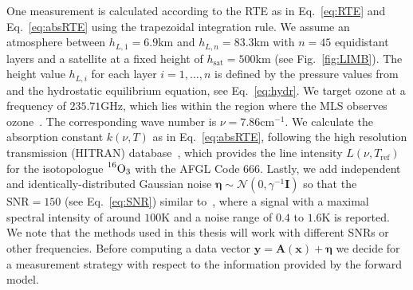 One measurement is calculated according to the RTE as in Eq.~\ref{eq:RTE} and Eq.~\ref{eq:absRTE} using the trapezoidal integration rule.
We assume an atmosphere between $h_{L,1} = 6.9$km and $h_{L,n} = 83.3$km with $n = 45$ equidistant layers and a satellite at a fixed height of $h_{\text{sat}} = 500$km (see Fig.~\ref{fig:LIMB}).
The height value $h_{L,i}$ for each layer $i = 1,\dots, n$ is defined by the pressure values from~\cite{MLSdata} and the hydrostatic equilibrium equation, see Eq.~\ref{eq:hydr}.
We target ozone at a frequency of $235.71$GHz, which lies within the region where the MLS observes ozone~\cite{livesey2008ozonecarbonmono, waters2006earth}.
The corresponding wave number is $\nu = 7.86\text{cm}^{-1}$.
We calculate the absorption constant $k(\nu,T)$ as in Eq.~\ref{eq:absRTE}, following the high resolution transmission (HITRAN) database~\cite{gordon2022hitran2020}, which provides the line intensity $L(\nu,T_{\text{ref}})$ for the isotopologue $\prescript{16}{}{\text{O}}_3$ with the AFGL Code 666.
Lastly, we add independent and identically-distributed Gaussian noise $\bm{\eta} \sim \mathcal{N}(0,\gamma^{-1} \bm{I})$ so that the $\text{SNR}=150$ (see Eq.~\ref{eq:SNR}) similar to~\cite{Froidevaux2008snrozone}, where a signal with a maximal spectral intensity of around $100\text{K}$ and a noise range of $0.4$ to $1.6\text{K}$ is reported.
We note that the methods used in this thesis will work with different SNRs or other frequencies.
Before computing a data vector $\bm{y} = \bm{A}(\bm{x}) + \bm{\eta} $ we decide for a measurement strategy with respect to the information provided by the forward model.

